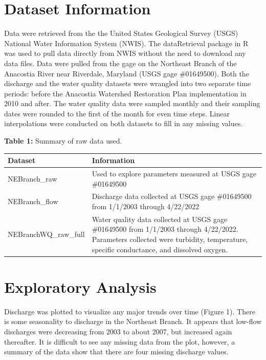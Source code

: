 \documentclass[
  12pt,
]{article}
\begin{document}
\newpage

\hypertarget{dataset-information}{%
\section{Dataset Information}\label{dataset-information}}

Data were retrieved from the the United States Geological Survey (USGS)
National Water Information System (NWIS). The dataRetrieval package in R
was used to pull data directly from NWIS without the need to download
any data files. Data were pulled from the gage on the Northeast Branch
of the Anacostia River near Riverdale, Maryland (USGS gage \#01649500).
Both the discharge and the water quality datasets were wrangled into two
separate time periods: before the Anacostia Watershed Restoration Plan
implementation in 2010 and after. The water quality data were sampled
monthly and their sampling dates were rounded to the first of the month
for even time steps. Linear interpolations were conducted on both
datasets to fill in any missing values.

\textbf{Table 1:} Summary of raw data used.

\begin{longtable}[]{@{}
  >{\raggedright\arraybackslash}p{}
  >{\raggedright\arraybackslash}p{}@{}}
\toprule
Dataset & Information \\
\midrule
\endhead
NEBranch\_raw & Used to explore parameters measured at USGS gage
\#01649500 \\
NEBranch\_flow & Discharge data collected at USGS gage \#01649500 from
1/1/2003 through 4/22/2022 \\
NEBranchWQ\_raw\_full & Water quality data collected at USGS gage
\#01649500 from 1/1/2003 through 4/22/2022. Parameters collected were
turbidity, temperature, specific conductance, and dissolved oxygen. \\
\bottomrule
\end{longtable}

\newpage

\hypertarget{exploratory-analysis}{%
\section{Exploratory Analysis}\label{exploratory-analysis}}

Discharge was plotted to visualize any major trends over time (Figure
1). There is some seasonality to discharge in the Northeast Branch. It
appears that low-flow discharges were decreasing from 2003 to about
2007, but increased again thereafter. It is difficult to see any missing
data from the plot, however, a summary of the data show that there are
four missing discharge values.
\end{document}
